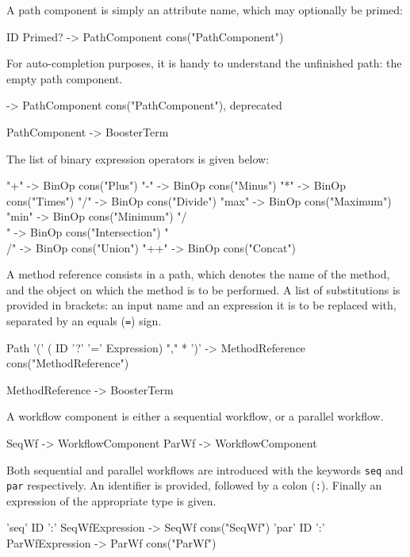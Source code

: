 A path component is simply an attribute name, which may optionally be
primed:

\begin{code}
ID Primed? -> PathComponent {cons("PathComponent")}
\end{code}

For auto-completion purposes, it is handy to understand the unfinished
path: the empty path component.
\begin{code}
  -> PathComponent {cons("PathComponent"), deprecated}

PathComponent -> BoosterTerm
\end{code}

The list of binary expression operators is given below:

\begin{code}
"+"	-> BinOp {cons("Plus")}
"-" 	-> BinOp {cons("Minus")}
"*" 	-> BinOp {cons("Times")}
"/" 	-> BinOp {cons("Divide")}
"max" 	-> BinOp {cons("Maximum")}
"min" 	-> BinOp {cons("Minimum")}
"/\\" 	-> BinOp {cons("Intersection")}
"\\/" 	-> BinOp {cons("Union")}
"++" 	-> BinOp {cons("Concat")}
\end{code}


A method reference consists in a path, which denotes the name of the
method, and the object on which the method is to be performed.  A list
of substitutions is provided in brackets: an input name and an
expression it is to be replaced with, separated by an equals
(\verb|=|) sign.

\begin{code}
Path '(' { ( ID '?' '=' Expression) "," }* ')' 
                            -> MethodReference {cons("MethodReference")}

MethodReference -> BoosterTerm
\end{code}

A workflow component is either a sequential workflow, or a parallel
workflow.

\begin{code}
SeqWf -> WorkflowComponent
ParWf -> WorkflowComponent
\end{code}

Both sequential and parallel workflows are introduced with the
keywords \verb|seq| and \verb|par| respectively.  An identifier is
provided, followed by a colon (\verb|:|).  Finally an expression
of the appropriate type is given.

\begin{code}
'seq' ID ':' SeqWfExpression -> SeqWf {cons("SeqWf")}
'par' ID ':' ParWfExpression -> ParWf {cons("ParWf")}
\end{code}

